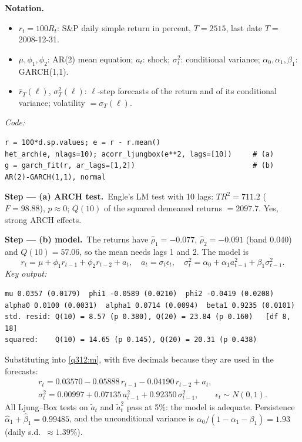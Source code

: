 \documentclass[11pt,a4paper]{article}
\newenvironment{notacao}{\par\smallskip\noindent\textbf{Notation.}\begin{itemize}[leftmargin=1.4em,topsep=1pt,itemsep=0pt]\small}{\end{itemize}}
\newcommand{\passo}[2]{\par\smallskip\noindent\textbf{Step --- #1.}~#2}
\begin{document}
\begin{sol}
\begin{notacao}
\item $r_t=100R_t$: S\&P daily simple return in percent, $T=2515$, last date $T=$ 2008-12-31.
\item $\mu,\phi_1,\phi_2$: AR(2) mean equation; $a_t$: shock; $\sigma_t^2$: conditional variance; $\alpha_0,\alpha_1,\beta_1$: GARCH(1,1).
\item $\hat r_T(\ell)$, $\sigma_T^2(\ell)$: $\ell$-step forecasts of the return and of its conditional variance; volatility $=\sigma_T(\ell)$.
\end{notacao}
\noindent\textit{Code:}
\begingroup\footnotesize
\begin{verbatim}
r = 100*d.sp.values; e = r - r.mean()
het_arch(e, nlags=10); acorr_ljungbox(e**2, lags=[10])     # (a)
g = garch_fit(r, ar_lags=[1,2])                            # (b) AR(2)-GARCH(1,1), normal
\end{verbatim}
\endgroup
\passo{(a) ARCH test}{Engle's LM test with 10 lags: $TR^2=711.2$ ($F=98.88$), $p\approx0$; $Q(10)$ of the
squared demeaned returns $=2097.7$. Yes, strong ARCH effects.}
\passo{(b) model}{The returns have $\hat\rho_1=-0.077$, $\hat\rho_2=-0.091$ (band $0.040$) and $Q(10)=57.06$,
so the mean needs lags 1 and 2. The model is}
\begin{equation}\label{q312:m} r_t=\mu+\phi_1r_{t-1}+\phi_2r_{t-2}+a_t,\quad a_t=\sigma_t\epsilon_t,\quad \sigma_t^2=\alpha_0+\alpha_1a_{t-1}^2+\beta_1\sigma_{t-1}^2 . \end{equation}
\noindent\textit{Key output:}
\begingroup\footnotesize
\begin{verbatim}
mu 0.0357 (0.0179)  phi1 -0.0589 (0.0210)  phi2 -0.0419 (0.0208)
alpha0 0.0100 (0.0031)  alpha1 0.0714 (0.0094)  beta1 0.9235 (0.0101)
std. resid: Q(10) = 8.57 (p 0.380), Q(20) = 23.84 (p 0.160)   [df 8, 18]
squared:    Q(10) = 14.65 (p 0.145), Q(20) = 20.31 (p 0.438)
\end{verbatim}
\endgroup
Substituting into \eqref{q312:m}, with five decimals because they are used in the forecasts:
\begin{gather}
r_t=0.03570-0.05888\,r_{t-1}-0.04190\,r_{t-2}+a_t, \label{q312:mean}\\
\sigma_t^2=0.00997+0.07135\,a_{t-1}^2+0.92350\,\sigma_{t-1}^2,\qquad \epsilon_t\sim N(0,1). \label{q312:var}
\end{gather}
All Ljung--Box tests on $\tilde a_t$ and $\tilde a_t^2$ pass at 5\%: the model is adequate. Persistence
$\hat\alpha_1+\hat\beta_1=0.99485$, and the unconditional variance is $\alpha_0/(1-\alpha_1-\beta_1)=1.93$ (daily s.d.\ $\approx1.39\%$).


\end{sol}
\end{document}
